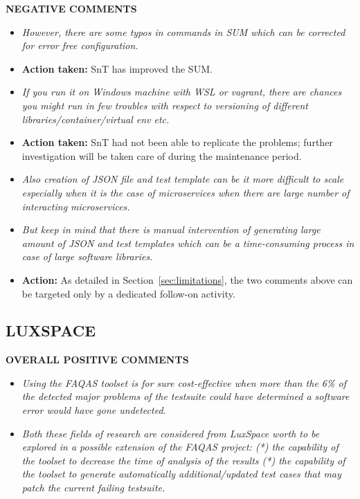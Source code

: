 \textbf{NEGATIVE  COMMENTS}  
\begin{itemize}
\item \emph{However, there are some typos in commands in SUM which can be corrected for error free configuration.} 

\item \textbf{Action taken:} SnT has improved the SUM.

\item \emph{If you run it on Windows machine with WSL or vagrant, there are chances you might run in few troubles with respect to versioning of different libraries/container/virtual env etc.} 

\item \textbf{Action taken:} SnT had not been able to replicate the problems; further investigation will be taken care of during the maintenance period.  

\item \emph{Also creation of JSON file and test template can be it more difficult to scale especially when it is the case of microservices when there are large number of interacting microservices.} 

\item \emph{But keep in mind that there is manual intervention of generating large amount of JSON and test templates which can be a time-consuming process in case of large software libraries.} 

\item \textbf{Action:} As detailed in Section~\ref{sec:limitations}, the two comments above can be targeted only by a dedicated follow-on activity. 

\end{itemize}
 
\subsection{LUXSPACE}



\textbf{OVERALL POSITIVE COMMENTS} 

 

 
\begin{itemize}
\item \emph{Using the FAQAS toolset is for sure cost-effective when more than the 6\% of the detected major problems of the testsuite could have determined a software error would have gone undetected. }

 

\item \emph{Both these fields of research are considered from LuxSpace worth to be explored in a possible extension of the FAQAS project: 
(*) the capability of the toolset to decrease the time of analysis of the results (*) the capability of the toolset to generate automatically additional/updated test cases that may patch the current failing testsuite.} 
\end{itemize}
 

